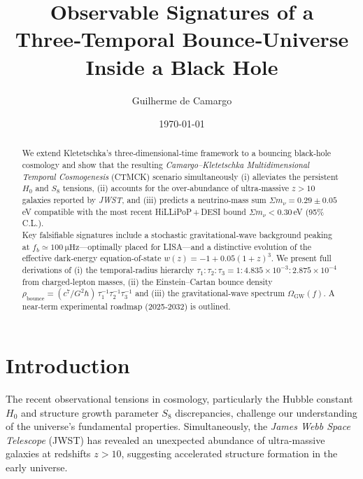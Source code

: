 \documentclass[reprint,amsmath,amssymb,aps,prd,nofootinbib,longbibliography]{revtex4-2}
\begin{document}
\title{Observable Signatures of a Three‑Temporal Bounce‑Universe Inside a Black Hole}

\author{Guilherme de Camargo}
\date{\today}


\begin{abstract}
We extend Kletetschka's three‑dimensional‑time framework to a bouncing black‑hole cosmology and show that the resulting \textit{Camargo–Kletetschka Multidimensional Temporal Cosmogenesis} (CTMCK) scenario simultaneously (i) alleviates the persistent $H_0$ and $S_8$ tensions, (ii) accounts for the over‑abundance of ultra‑massive $z>10$ galaxies reported by \textit{JWST}, and (iii) predicts a neutrino‑mass sum $\Sigma m_\nu = 0.29\pm0.05\,$eV compatible with the most recent HiLLiPoP\,+\,DESI bound $\Sigma m_\nu<0.30\,$eV (95\% C.L.). \\[2pt]
Key falsifiable signatures include a stochastic gravitational‑wave background peaking at $f_b\simeq\SI{100}{\micro\hertz}$—optimally placed for \textsc{LISA}—and a distinctive evolution of the effective dark‑energy equation‑of‑state $w(z)=-1+0.05(1+z)^3$. We present full derivations of (i) the temporal‑radius hierarchy $\tau_1\!:\!\tau_2\!:\!\tau_3 = 1\!:\!4.835\times10^{-3}\!:\!2.875\times10^{-4}$ from charged‑lepton masses, (ii) the Einstein–Cartan bounce density $\rho_{\text{bounce}}=(c^7/G^2\hbar)\,\tau_1^{-1}\tau_2^{-1}\tau_3^{-1}$ and (iii) the gravitational‑wave spectrum $\Omega_{\mathrm{GW}}(f)$. A near‑term experimental roadmap (2025‑2032) is outlined.
\end{abstract}

\maketitle


\section{Introduction}

The recent observational tensions in cosmology, particularly the Hubble constant $H_0$ and structure growth parameter $S_8$ discrepancies, challenge our understanding of the universe's fundamental properties. Simultaneously, the \textit{James Webb Space Telescope} (JWST) has revealed an unexpected abundance of ultra-massive galaxies at redshifts $z > 10$, suggesting accelerated structure formation in the early universe.
\end{document}
